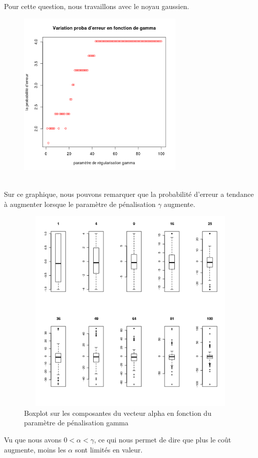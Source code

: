 \documentclass[a4paper, 10pt]{article}
\begin{document}
Pour cette question, nous travaillons avec le noyau gaussien.\\
\begin{figure}[h!]
\centering
\includegraphics[height = 8cm, width = 8cm]{plots/ex4_q2_proba_erreur_gamma.png}
\end{figure}\\
Sur ce graphique, nous pouvons remarquer que la probabilité d'erreur a tendance à augmenter lorsque le paramètre de pénalisation $\gamma$ augmente.\\
\begin{figure}[h!]
\centering
  \includegraphics[height = 10cm, width = 15cm]{plots/ex4_q2_boxplot_alpha_.png} 
  \caption{Boxplot sur les composantes du vecteur alpha en fonction du paramètre de pénalisation gamma}
\end{figure}
\newpage
\noindent
Vu que nous avons $0 < \alpha < \gamma$, ce qui nous permet de dire que plus le coût augmente, moins les $\alpha$ sont limités en valeur.\\
\end{document}
